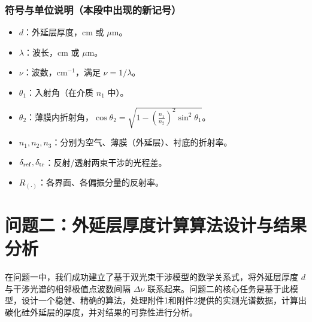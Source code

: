 \documentclass[withoutpreface,bwprint]{cumcmthesis} %
\begin{document}
\subsubsection{符号与单位说明（本段中出现的新记号）}
\begin{itemize}
    \item \(d\)：外延层厚度，cm 或 \(\mu\)m。
    \item \(\lambda\)：波长，cm 或 \(\mu\)m。
    \item \(\nu\)：波数，cm\(^{-1}\)，满足 \(\nu=1/\lambda\)。
    \item \(\theta_1\)：入射角（在介质 \(n_1\) 中）。
    \item \(\theta_2\)：薄膜内折射角，\(\cos\theta_2=\sqrt{1-(\tfrac{n_1}{n_2})^2\sin^2\theta_1}\)。
    \item \(n_1,n_2,n_3\)：分别为空气、薄膜（外延层）、衬底的折射率。
    \item \(\delta_{\rm ref},\delta_{\rm tr}\)：反射/透射两束干涉的光程差。
    \item \(R_{(\cdot)}\)：各界面、各偏振分量的反射率。
\end{itemize}


\section{问题二：外延层厚度计算算法设计与结果分析}

在问题一中，我们成功建立了基于双光束干涉模型的数学关系式，将外延层厚度 $d$ 与干涉光谱的相邻极值点波数间隔 $\Delta\nu$ 联系起来。问题二的核心任务是基于此模型，设计一个稳健、精确的算法，处理附件1和附件2提供的实测光谱数据，计算出碳化硅外延层的厚度，并对结果的可靠性进行分析。
\end{document}
